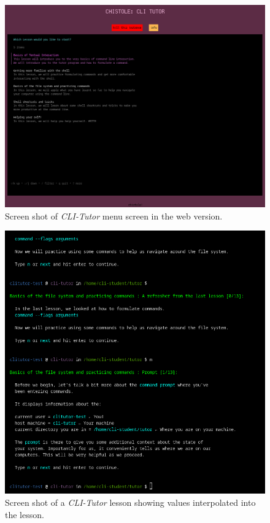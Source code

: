 \begin{figure}[htbp]
	\centering
	\includegraphics[width=1\textwidth]{img/cliwebfull}
	\caption{Screen shot of \textit{CLI-Tutor} menu screen in the web version.}
	\label{fig:webversion}
\end{figure}

\begin{figure}[htbp]
	\centering
	\includegraphics[width=1\textwidth]{img/cliexpansionfull}
	\caption{Screen shot of a \textit{CLI-Tutor} lesson showing values interpolated into the lesson.}
	\label{fig:webversion}
\end{figure}


